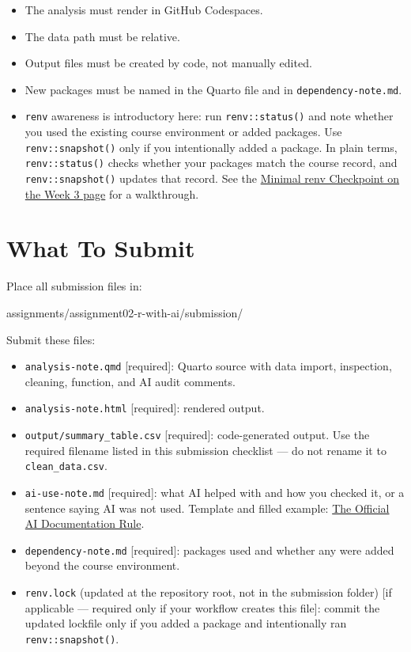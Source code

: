 \documentclass[
  letterpaper,
  DIV=11,
  numbers=noendperiod,
  oneside]{scrreprt}
\newenvironment{Shaded}{\begin{snugshade}}{\end{snugshade}}
\newcommand{\NormalTok}[1]{\textcolor[rgb]{0.00,0.23,0.31}{#1}}
\providecommand{\tightlist}{%
  \setlength{\itemsep}{0pt}\setlength{\parskip}{0pt}}
\begin{document}
\begin{itemize}
\tightlist
\item
  The analysis must render in GitHub Codespaces.
\item
  The data path must be relative.
\item
  Output files must be created by code, not manually edited.
\item
  New packages must be named in the Quarto file and in
  \texttt{dependency-note.md}.
\item
  \texttt{renv} awareness is introductory here: run
  \texttt{renv::status()} and note whether you used the existing course
  environment or added packages. Use \texttt{renv::snapshot()} only if
  you intentionally added a package. In plain terms,
  \texttt{renv::status()} checks whether your packages match the course
  record, and \texttt{renv::snapshot()} updates that record. See the
  \hyperref[minimal-renv-checkpoint]{Minimal renv Checkpoint on the Week
  3 page} for a walkthrough.
\end{itemize}

\section{What To Submit}\label{what-to-submit-1}

Place all submission files in:

\begin{Shaded}
\begin{Highlighting}[numbers=left,,]
\NormalTok{assignments/assignment02{-}r{-}with{-}ai/submission/}
\end{Highlighting}
\end{Shaded}

Submit these files:

\begin{itemize}
\tightlist
\item
  \texttt{analysis-note.qmd} {[}required{]}: Quarto source with data
  import, inspection, cleaning, function, and AI audit comments.
\item
  \texttt{analysis-note.html} {[}required{]}: rendered output.
\item
  \texttt{output/summary\_table.csv} {[}required{]}: code-generated
  output. Use the required filename listed in this submission checklist
  --- do not rename it to \texttt{clean\_data.csv}.
\item
  \texttt{ai-use-note.md} {[}required{]}: what AI helped with and how
  you checked it, or a sentence saying AI was not used. Template and
  filled example: \hyperref[the-official-ai-documentation-rule]{The
  Official AI Documentation Rule}.
\item
  \texttt{dependency-note.md} {[}required{]}: packages used and whether
  any were added beyond the course environment.
\item
  \texttt{renv.lock} (updated at the repository root, not in the
  submission folder) {[}if applicable --- required only if your workflow
  creates this file{]}: commit the updated lockfile only if you added a
  package and intentionally ran \texttt{renv::snapshot()}.
\end{itemize}
\end{document}
